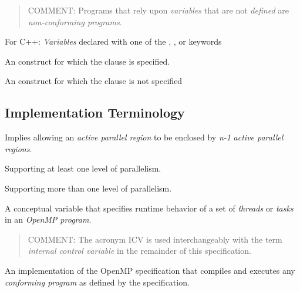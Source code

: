 \begin{quote}
COMMENT: Programs that rely upon \emph{variables} that are not \emph{defined} are \emph{non-conforming programs}.
\end{quote}
\glossarydefend

\glossarydefstart
For C++: \emph{Variables} declared with one of the , , or  keywords
\glossarydefend

\glossarydefstart
An  construct for which the  clause is specified.
\glossarydefend
\bigskip

\glossarydefstart
An  construct for which the  clause is not specified
\glossarydefend
\bigskip
\bigskip
\bigskip





\subsection{Implementation Terminology}
\label{subsec:Implementation Terminology}
\glossarydefstart
Implies allowing an \emph{active parallel region} to be enclosed by \emph{n-1} \emph{active parallel 
regions}.
\glossarydefend

\glossarydefstart
Supporting at least one level of parallelism.
\glossarydefend
\bigskip

\glossarydefstart
Supporting more than one level of parallelism.  
\glossarydefend
\bigskip

\glossarydefstart
A conceptual variable that specifies runtime behavior of a set of \emph{threads} or \emph{tasks} 
in an \emph{OpenMP program}.

\begin{quote}
COMMENT: The acronym ICV is used interchangeably with the term \emph{internal 
control variable} in the remainder of this specification.
\end{quote}
\glossarydefend

\glossarydefstart
An implementation of the OpenMP specification that compiles and executes any 
\emph{conforming program} as defined by the specification.

